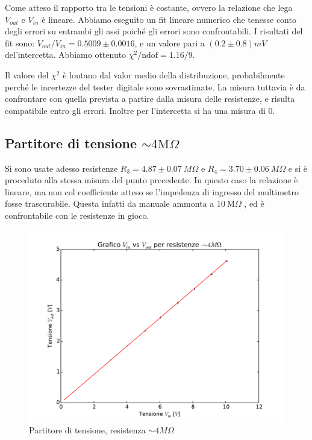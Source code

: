 \documentclass[10pt,a4paper]{article}
\begin{document}
Come atteso il rapporto tra le tensioni è costante, ovvero la relazione che lega $V_{out}$ e $V_{in}$ è lineare.
Abbiamo eseguito un fit lineare numerico che tenesse conto degli errori su entrambi gli assi poiché gli errori sono confrontabili. I risultati del fit sono: $V_{out}/V_{in}=0.5009 \pm 0.0016$, e un valore pari a $(0.2\pm 0.8) mV$ del'intercetta. Abbiamo ottenuto  $\chi^2/\text{ndof}= 1.16/9$.

Il valore del $\chi^2$ è lontano dal valor medio della distribuzione, probabilmente perché le incertezze del tester digitale sono sovrastimate. La misura tuttavia è da confrontare con quella prevista a partire dalla misura delle resistenze, e risulta compatibile entro gli errori. Inoltre per l'intercetta si ha una misura di $0$.

\subsection{Partitore di tensione $\sim4\text{M}\Omega$}
Si sono usate adesso resistenze $R_3=4.87 \pm 0.07 ~M\Omega$ e $R_4=3.70 \pm 0.06 ~M\Omega$ e si è proceduto alla stessa misura del punto precedente. In questo caso la relazione è lineare, ma non col coefficiente atteso se l'impedenza di ingresso del multimetro fosse trascurabile. Questa infatti da manuale ammonta a $10 ~ \text{M}\Omega$ , ed è confrontabile con le resistenze in gioco.

\begin{figure}[h]
\centering
	\begin{minipage}[h]{0.35\textwidth}
		\centering
		
	\end{minipage}%
	\begin{minipage}[h]{0.65\textwidth}
		\centering
		\includegraphics[width=1\textwidth]{../grafici/fit_4MOhm.pdf}
		\caption{Partitore di tensione, resistenza $\sim 4M\Omega$}
	\end{minipage}
\end{figure}
\end{document}
